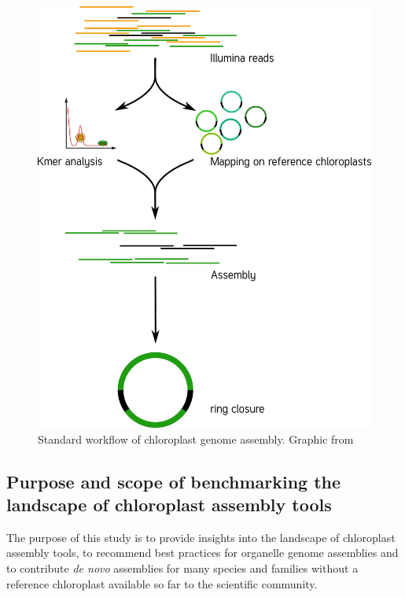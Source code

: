 \begin{figure}[H]
\centering
\includegraphics[height=.65\textheight, width=.95\textwidth]{Figures/CE_workflow}
\decoRule
\caption[Chloroplast genome assembly workflow]{Standard workflow of chloroplast genome assembly. Graphic from \cite{j_ankenbrand_chloroextractor:_2018} }
\label{fig:cpast_workflow}
\end{figure}

\subsection{Purpose and scope of benchmarking the landscape of chloroplast assembly tools}

The purpose of this study is to provide insights into the landscape of chloroplast
assembly tools, to recommend best practices for organelle genome assemblies and to
contribute \textit{de novo} assemblies for many species and families without a reference
chloroplast available so far to the scientific community. \\



